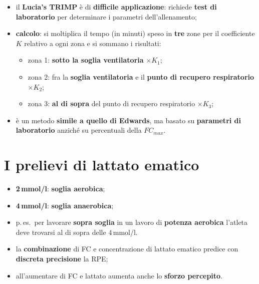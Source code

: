 \begin{itemize}
  \item il \textbf{Lucia's TRIMP} è di \textbf{difficile applicazione}: richiede \textbf{test di
    laboratorio} per determinare i parametri dell'allenamento;
  \item \textbf{calcolo}: si moltiplica il tempo (in minuti) speso in \textbf{tre} zone per il
    coefficiente $K$ relativo a ogni zona e si sommano i risultati:
    \begin{itemize}
      \item zona 1: \textbf{sotto la soglia ventilatoria} $\times K_1$;
      \item zona 2: fra la \textbf{soglia ventilatoria} e il \textbf{punto di recupero
        respiratorio} $\times K_2$;
      \item zona 3: \textbf{al di sopra} del punto di recupero respiratorio $\times K_3$;
    \end{itemize}
  \item è un metodo \textbf{simile a quello di Edwards}, ma basato su \textbf{parametri di
    laboratorio} anziché su percentuali della $FC_{max}$.
\end{itemize}

\section{I prelievi di lattato ematico}

\begin{itemize}
  \item \textbf{2\,mmol/l}: \textbf{soglia aerobica};
  \item \textbf{4\,mmol/l}: \textbf{soglia anaerobica};
  \item p.\,es.\ per lavorare \textbf{sopra soglia} in un lavoro di \textbf{potenza aerobica}
    l'atleta deve trovarsi al di sopra delle 4\,mmol/l.
\end{itemize}

\begin{itemize}
  \item la \textbf{combinazione} di FC e concentrazione di lattato ematico predice con
    \textbf{discreta precisione} la RPE;
  \item all'aumentare di FC e lattato aumenta anche lo \textbf{sforzo percepito}.
\end{itemize}

